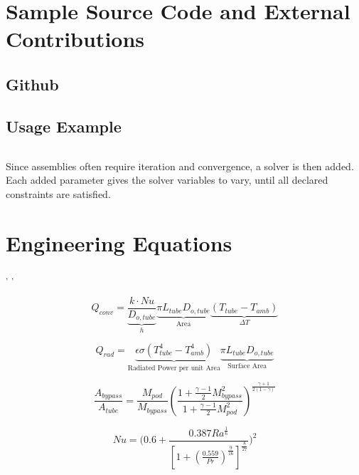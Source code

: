 \newpage
\appendix

\section{Sample Source Code and External Contributions} \label{app:Github}

\subsection{Github}


\subsection{Usage Example}



\inputminted[fontsize=\tiny]{python}{code/example1.py}


 Since assemblies often require iteration and convergence, a solver is then added. Each added parameter gives the solver variables to vary, until all declared constraints are satisfied.

\section{Engineering Equations}

\cite{Cengal}\textsuperscript{,}
\cite{Turns}\textsuperscript{,}
\cite{Churchill}

\begin{equation}
Q_{conv} = \underbrace{ \frac{k\cdot Nu}{ {D}_{o,tube}} }_\text{$h$}
 \underbrace{ \pi {L}_{tube} {D}_{o,tube} }_\text{Area}
 \underbrace{ (T_{tube}-T_{amb})  }_\text{$\Delta T$}
\end{equation}

\begin{equation}
Q_{rad} = \underbrace{\epsilon \sigma (T_{tube}^4 - T_{amb}^4)}_\text{Radiated Power per unit Area}\underbrace{\pi L_{tube} D_{o,tube}}_\text{Surface Area}
\end{equation}

\begin{equation}
\frac{A_{bypass}}{A_{tube}} = \frac{M_{pod}}{M_{bypass}}
\left(\frac{1+ \frac{\gamma-1}{2} M_{bypass}^2}
{1+ \frac{\gamma-1}{2} M_{pod}^2}\right)^{\frac{\gamma+1}{2\left(1-\gamma\right)}}
\label{e:a-over-astar}
\end{equation}

\begin{equation}
Nu = \Bigg(0.6 + \frac{0.387Ra^{\frac{1}{6}}}{[1+(\frac{0.559}{Pr})^{\frac{9}{16}}]^{\frac{8}{27}}}\Bigg)^2
\end{equation}

